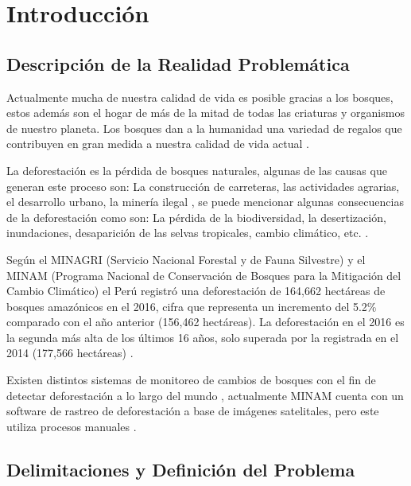 \chapter{Introducción}
\label{chap:introduccion}

\section{Descripción de la Realidad Problemática}

Actualmente mucha de nuestra calidad de vida es posible gracias a los bosques, estos además son el hogar de más de la mitad de todas las criaturas y organismos de nuestro planeta. Los bosques dan a la humanidad una variedad de regalos que contribuyen en gran medida a nuestra calidad de vida actual \cite{balvanera2012servicios}.


La deforestación es la pérdida de bosques naturales, algunas de las causas que generan este proceso son: La construcción de carreteras, las actividades agrarias, el desarrollo urbano, la minería ilegal \cite{fearnside2005deforestation}, se puede mencionar algunas consecuencias de la deforestación como son: La pérdida de la biodiversidad, la desertización, inundaciones, desaparición de las selvas tropicales, cambio climático, etc. \cite{garcia2016deforestation}.


Según el MINAGRI (Servicio Nacional Forestal y de Fauna Silvestre) y el MINAM (Programa Nacional de Conservación de Bosques para la Mitigación del Cambio Climático) el Perú registró una deforestación de 164,662 hectáreas de bosques amazónicos en el 2016, cifra que representa un incremento del 5.2\% comparado con el año anterior (156,462 hectáreas). La deforestación en el 2016 es la segunda más alta de los últimos 16 años, solo superada por la registrada en el 2014 (177,566 hectáreas) \cite{noticia1}.


Existen distintos sistemas de monitoreo de cambios de bosques con el fin de detectar deforestación a lo largo del mundo \cite{MinisteriodelambientedelPeru}, actualmente MINAM cuenta con un software de rastreo de deforestación a base de imágenes satelitales, pero este utiliza procesos manuales \cite{MinisteriodelAmbiente}.
%
\section{Delimitaciones y Definición del Problema}

